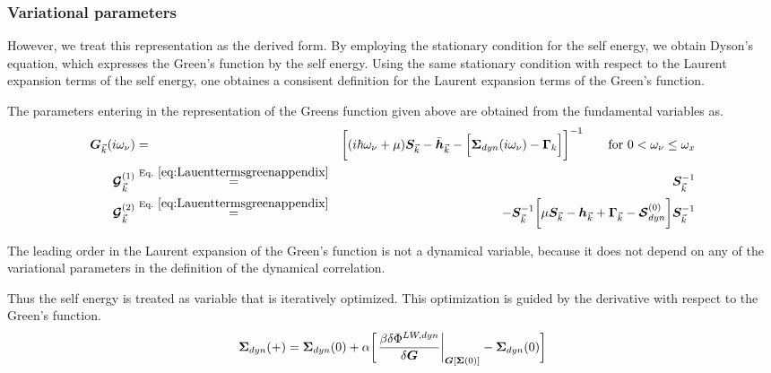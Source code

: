 \documentclass[11pt,a4paper]{report}
\begin{document}
\subsubsection{Variational parameters}
However, we treat this representation as the derived form.  By
employing the stationary condition for the self energy, we obtain
Dyson's equation, which expresses the Green's function by the self
energy. Using the same stationary condition with respect to the
Laurent expansion terms of the self energy, one obtaines a consisent
definition for the Laurent expansion terms of the Green's function.

The parameters entering in the representation
 of the Greens function given above are
obtained from the fundamental variables as.
\begin{eqnarray}
\mat{G}_{\vec{k}}(i\omega_\nu)&=&
\biggl[
(i\hbar\omega_\nu+\mu)\mat{S}_{\vec{k}}-\bar{\mat{h}}_{\vec{k}}
-
\Bigl[\mat{\Sigma}_{dyn}(i\omega_\nu)-\mat{\Gamma}_k\Bigr]
\biggr]^{-1}
\qquad\text{for $0<\omega_\nu\le\omega_x$}
\nonumber\\
\mat{\mathcal{G}}^{(1)}_{\vec{k}}
&\eqrel{eq:Lauenttermsgreenappendix}{=}&
\mat{S}_{\vec{k}}^{-1}
\nonumber\\
\mat{\mathcal{G}}^{(2)}_{\vec{k}}
&\eqrel{eq:Lauenttermsgreenappendix}{=}&
-\mat{S}_{\vec{k}}^{-1}
\biggl[\mu\mat{S}_{\vec{k}}-\mat{h}_{\vec{k}}
+\mat{\Gamma}_{\vec{k}}-\mat{\mathcal{S}}^{(0)}_{dyn}
\biggr]
\mat{S}_{\vec{k}}^{-1}
\end{eqnarray}

The leading order in the Laurent expansion of the Green's function is
not a dynamical variable, because it does not depend on any of the
variational parameters in the definition of the dynamical correlation.


Thus the self energy is treated as variable that is iteratively
optimized. This optimization is guided by the derivative with respect
to the Green's function.
\begin{eqnarray}
\bm{\Sigma}_{dyn}(+)=\bm{\Sigma}_{dyn}(0)+\alpha
\biggl[\left.\frac{\beta\delta\Phi^{LW,dyn}}{\delta\bm{G}}
\right|_{\bm{G}[\bm{\Sigma}(0)]}
-\bm{\Sigma}_{dyn}(0)\biggr]
\end{eqnarray}
\end{document}
